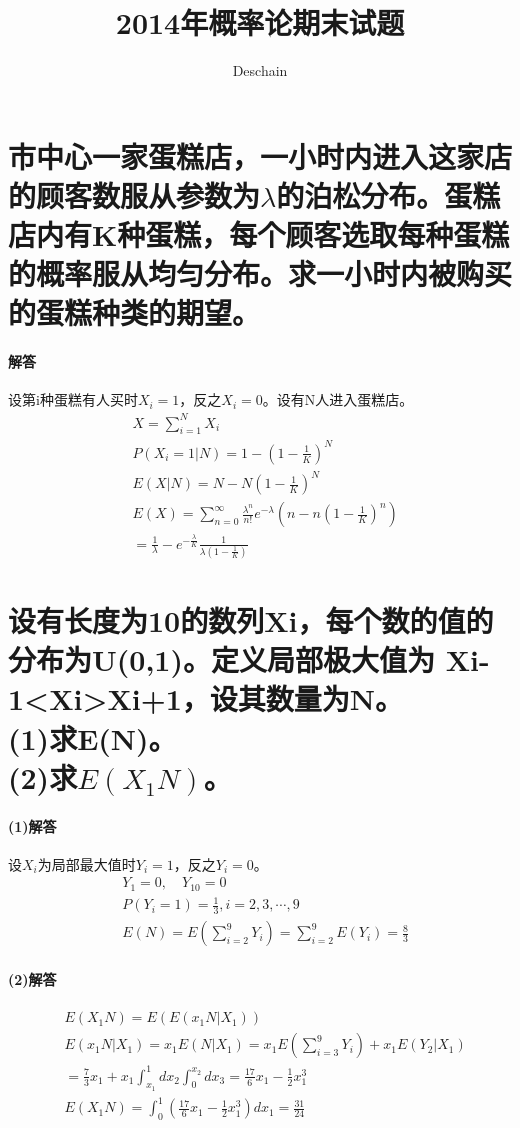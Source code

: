 \documentclass[UTF8]{ctexart}
\title{2014年概率论期末试题}
\author{Deschain}
\begin{document}
\maketitle
\section{市中心一家蛋糕店，一小时内进入这家店的顾客数服从参数为$\lambda$的泊松分布。蛋糕店内有K种蛋糕，每个顾客选取每种蛋糕的概率服从均匀分布。求一小时内被购买的蛋糕种类的期望。}
\paragraph{解答}
设第i种蛋糕有人买时$X_i=1$，反之$X_i=0$。设有N人进入蛋糕店。
\begin{equation*}
\begin{aligned}
&X=\sum_{i=1}^N{X_i}\\
&P(X_i=1\lvert N)=1-(1-\frac{1}{K})^N\\
&E(X\lvert N)=N-N(1-\frac{1}{K})^N\\
&E(X)=\sum_{n=0}^{\infty}{\frac{\lambda^n}{n!}e^{-\lambda}(n-n(1-\frac{1}{K})^n)}\\
&=\frac{1}{\lambda}-e^{-\frac{\lambda}{K}}\frac{1}{\lambda(1-\frac{1}{K})}
\end{aligned}
\end{equation*}
\section{设有长度为10的数列Xi，每个数的值的分布为U(0,1)。定义局部极大值为
Xi-1<Xi>Xi+1，设其数量为N。\\
(1)求E(N)。\\
(2)求$E(X_1N)$。}
\paragraph{(1)解答}
设$X_i$为局部最大值时$Y_i=1$，反之$Y_i=0$。
\begin{equation*}
\begin{aligned}
&Y_1=0,\quad Y_10=0\\
&P(Y_i=1)=\frac{1}{3},i=2,3,\cdots,9\\
&E(N)=E(\sum_{i=2}^9{Y_i})=\sum_{i=2}^9{E(Y_i)}=\frac{8}{3}
\end{aligned}
\end{equation*}
\paragraph{(2)解答}
\begin{equation*}
\begin{aligned}
&E(X_1N)=E(E(x_1N\lvert X_1))\\
&E(x_1N\lvert X_1)=x_1E(N\vert X_1)=x_1E(\sum_{i=3}^9{Y_i})+x_1E(Y_2\lvert X_1)\\
&=\frac{7}{3}x_1+x_1\int_{x_1}^{1}{dx_2}\int_0^{x_2}{dx_3}=\frac{17}{6}x_1-\frac{1}{2}x_1^3\\
&E(X_1N)=\int_0^1{(\frac{17}{6}x_1-\frac{1}{2}x_1^3)dx_1}=\frac{31}{24}
\end{aligned}
\end{equation*}
\end{document}
